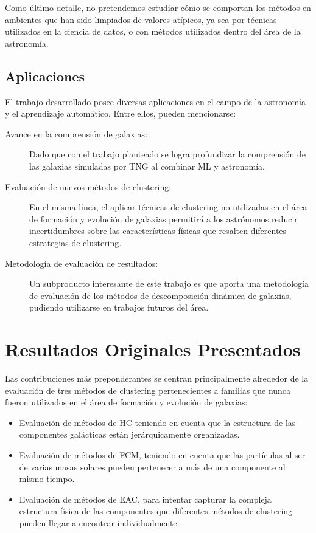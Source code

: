 Como último detalle, no pretendemos estudiar cómo se comportan los métodos en ambientes que han sido limpiados de valores atípicos, ya sea por técnicas utilizados en la ciencia de datos, o con métodos utilizados dentro del área de la astronomía.

\subsection{Aplicaciones}

El trabajo desarrollado posee diversas aplicaciones en el campo de la astronomía y el aprendizaje automático. Entre ellos, pueden mencionarse:

\begin{description}
\item[Avance en la comprensión de galaxias:]
Dado que con el trabajo planteado se logra profundizar la comprensión de las galaxias simuladas por \gls{TNG} al combinar \gls{ML} y astronomía. 

\item[Evaluación de nuevos métodos de clustering:]
En el misma línea, el aplicar técnicas de clustering no utilizadas en el área de formación y evolución de galaxias permitirá a los astrónomos reducir incertidumbres sobre las características físicas que resalten diferentes estrategias de clustering.

\item[Metodología de evaluación de resultados:]
Un subproducto interesante de este trabajo es que aporta una metodología de evaluación de los métodos de descomposición dinámica de galaxias, pudiendo utilizarse en trabajos futuros del área.

\end{description}


\section{Resultados Originales Presentados}

Las contribuciones más preponderantes se centran principalmente alrededor de la evaluación de tres métodos de clustering pertenecientes a familias que nunca fueron utilizados en el área de formación y evolución de galaxias:

\begin{itemize}
    \item Evaluación de métodos de \gls{HC} teniendo en cuenta que la estructura de las componentes galácticas están jerárquicamente organizadas.
    \item Evaluación de métodos de \gls{FCM}, teniendo en cuenta que las partículas al ser de varias masas solares pueden pertenecer a más de una componente al mismo tiempo.
    \item Evaluación de métodos de \gls{EAC}, para intentar capturar la compleja estructura física de las componentes que diferentes métodos de clustering pueden llegar a encontrar individualmente.
\end{itemize}


